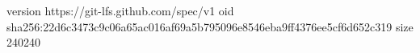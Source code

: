 version https://git-lfs.github.com/spec/v1
oid sha256:22d6c3473c9c06a65ac016af69a5b795096e8546eba9ff4376ee5cf6d652c319
size 240240
